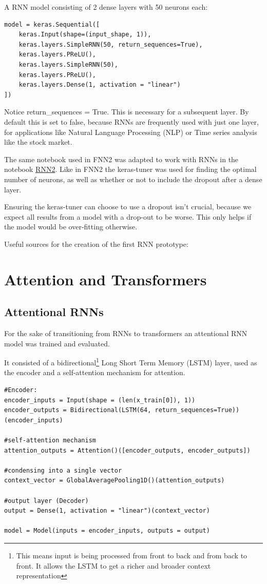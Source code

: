 \documentclass{article}
\begin{document}
A RNN model consisting of 2 dense layers with 50 neurons each:

\begin{Verbatim}
model = keras.Sequential([
    keras.Input(shape=(input_shape, 1)),
    keras.layers.SimpleRNN(50, return_sequences=True),
    keras.layers.PReLU(),
    keras.layers.SimpleRNN(50),
    keras.layers.PReLU(),
    keras.layers.Dense(1, activation = "linear")
])
\end{Verbatim}
Notice return\_sequences = True. This is necessary for a subsequent layer. 
By default this is set to false, because RNNs are frequently used with just 
one layer, for applications like Natural Language Processing (NLP) or Time 
series analysis like the stock market.

The same notebook used in FNN2 was adapted to work with RNNs in the notebook 
\href{https://github.com/AntonStantan/matura/blob/main/RNN/RNN2.ipynb}{RNN2}. 
Like in FNN2 the keras-tuner was used for finding the optimal number of 
neurons, as well as whether or not to include the dropout after a dense 
layer.

Ensuring the keras-tuner can choose to use a dropout isn't crucial, because 
we expect all results from a model with a drop-out to be worse. This only 
helps if the model would be over-fitting otherwise.


Useful sources for the creation of the first RNN prototype:
\cite{bowman2015recursiveneuralnetworkslearn, tensorflow_keras_rnn,ibm_rnn}


\section{Attention and Transformers}

\subsection{Attentional RNNs}
For the sake of transitioning from RNNs to transformers an attentional RNN 
model was trained and evaluated.

It consisted of a bidirectional\footnote{This means input is being processed 
from front to back and from back to front. It allows the LSTM to get a 
richer and broader context representation} Long Short Term Memory (LSTM) 
layer, used as the encoder and a self-attention mechanism for attention. 

\begin{Verbatim}
#Encoder:
encoder_inputs = Input(shape = (len(x_train[0]), 1))
encoder_outputs = Bidirectional(LSTM(64, return_sequences=True))(encoder_inputs)

#self-attention mechanism
attention_outputs = Attention()([encoder_outputs, encoder_outputs])

#condensing into a single vector
context_vector = GlobalAveragePooling1D()(attention_outputs)

#output layer (Decoder)
output = Dense(1, activation = "linear")(context_vector)

model = Model(inputs = encoder_inputs, outputs = output)
\end{Verbatim}
\end{document}
